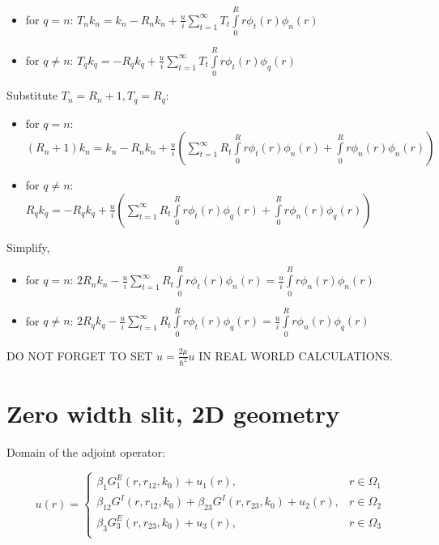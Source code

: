 \documentclass[12pt, a4paper]{article}
\begin{document}
\begin{itemize}
\item for $q = n$: $T_{n} k_n = k_n - R_{n} k_n + \frac{u}{i} \sum\limits_{t = 1}^{\infty} T_{t} \int\limits_{0}^R r \phi_t(r) \phi_n(r)$
\item for $q \ne n$: $T_{q} k_q = -R_{q} k_q + \frac{u}{i} \sum\limits_{t = 1}^\infty T_{t} \int\limits_{0}^R r \phi_t(r) \phi_q(r)$
\end{itemize}

Substitute $T_{n} = R_{n} + 1, T_{q} = R_{q}$:

\begin{itemize}
\item for $q = n$: $(R_{n} + 1) k_n = k_n - R_{n} k_n + \frac{u}{i} (\sum\limits_{t = 1}^{\infty} R_{t} \int\limits_{0}^R r \phi_t(r) \phi_n(r) + \int\limits_{0}^R r \phi_n(r) \phi_n(r))$
\item for $q \ne n$: $R_{q} k_q = -R_{q} k_q + \frac{u}{i} (\sum\limits_{t = 1}^\infty R_{t} \int\limits_{0}^R r \phi_t(r) \phi_q(r) + \int\limits_0^R r \phi_n(r) \phi_q(r))$
\end{itemize}

Simplify,

\begin{itemize}
\item for $q = n$: $2 R_{n} k_n - \frac{u}{i} \sum\limits_{t = 1}^{\infty} R_{t} \int\limits_{0}^R r \phi_t(r) \phi_n(r) =  \frac{u}{i} \int\limits_{0}^R r \phi_n(r) \phi_n(r)$
\item for $q \ne n$: $2 R_q k_q - \frac{u}{i} \sum\limits_{t = 1}^\infty R_{t} \int\limits_{0}^R r \phi_t(r) \phi_q(r) = \frac{u}{i} \int\limits_0^R r \phi_n(r) \phi_q(r)$
\end{itemize}

DO NOT FORGET TO SET $u = \frac{2 \mu}{\hbar^2} u$ IN REAL WORLD CALCULATIONS.

\section{Zero width slit, 2D geometry}
Domain of the adjoint operator:

$$u(r) = \begin{cases}
\beta_1 G_1^{E}(r, r_{12}, k_0) + u_1(r), & r \in \Omega_1 \\
\beta_{12} G^{I}(r, r_{12}, k_0) + \beta_{23} G^{I}(r, r_{23}, k_0) + u_2(r), & r \in \Omega_2 \\
\beta_3 G_3^{E}(r, r_{23}, k_0) + u_3(r), & r \in \Omega_3 \\
\end{cases}$$
\end{document}
